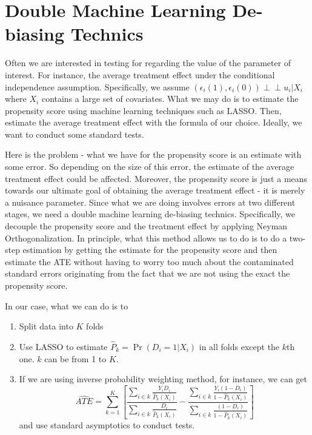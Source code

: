 \section{Double Machine Learning De-biasing Technics}
Often we are interested in testing for regarding the value of the parameter of interest. For instance, the average treatment effect under the conditional independence assumption. Specifically, we assume $(\epsilon_i(1),\epsilon_i(0))\perp\!\!\!\perp u_i|X_i$ where $X_i$ contains a large set of covariates. What we may do is to estimate the propensity score using machine learning techniques such as LASSO. Then, estimate the average treatment effect with the formula of our choice. Ideally, we want to conduct some standard tests. \par
Here is the problem - what we have for the propensity score is an estimate with some error. So depending on the size of this error, the estimate of the average treatment effect could be affected. Moreover, the propensity score is just a means towards our ultimate goal of obtaining the average treatment effect - it is merely a nuisance parameter. Since what we are doing involves errors at two different stages, we need a double machine learning de-biasing technics. Specifically, we decouple the propensity score and the treatment effect by applying Neyman Orthogonalization. In principle, what this method allows us to do is to do a two-step estimation by getting the estimate for the propensity score and then estimate the ATE without having to worry too much about the contaminated standard errors originating from the fact that we are not using the exact the propensity score. \par
In our case, what we can do is to
\begin{enumerate}
\item Split data into $K$ folds
\item Use LASSO to estimate $\hat{P}_k=\Pr(D_i=1|X_i)$ in all folds except the $k$th one. $k$ can be from 1 to $K$. 
\item If we are using inverse probability weighting method, for instance, we can get
\[
\widehat{ATE}=\sum_{k=1}^K\left[\frac{\sum_{i\in k}\frac{Y_iD_i}{\hat{P}_k(X_i)}}{\sum_{i\in k}\frac{D_i}{\hat{P}_k(X_i)}}-\frac{\sum_{i\in k}\frac{Y_i(1-D_i)}{1-\hat{P}_k(X_i)}}{\sum_{i\in k}\frac{(1-D_i)}{1-\hat{P}_k(X_i)}}\right]
\]
and use standard asymptotics to conduct tests. 
\end{enumerate}
